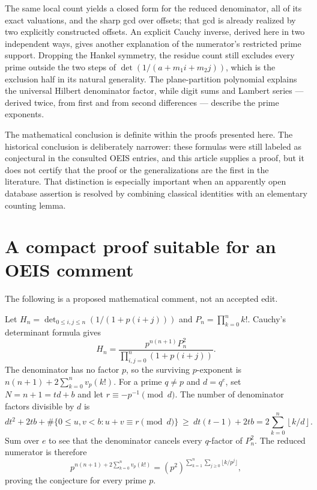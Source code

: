 \documentclass[11pt,a4paper]{article}
\numberwithin{equation}{section}
\theoremstyle{definition}
\theoremstyle{remark}
\newcommand{\floor}[1]{\left\lfloor#1\right\rfloor}
\begin{document}
The same local count yields a closed form for the reduced denominator, all of its exact valuations, and the sharp gcd over offsets; that gcd is already realized by two explicitly constructed offsets. An explicit Cauchy inverse, derived here in two independent ways, gives another explanation of the numerator's restricted prime support. Dropping the Hankel symmetry, the residue count still excludes every prime outside the two steps of $\det(1/(a+m_1i+m_2j))$, which is the exclusion half in its natural generality. The plane-partition polynomial explains the universal Hilbert denominator factor, while digit sums and Lambert series --- derived twice, from first and from second differences --- describe the prime exponents.

The mathematical conclusion is definite within the proofs presented here. The historical conclusion is deliberately narrower: these formulas were still labeled as conjectural in the consulted OEIS entries, and this article supplies a proof, but it does not certify that the proof or the generalizations are the first in the literature. That distinction is especially important when an apparently open database assertion is resolved by combining classical identities with an elementary counting lemma.

\appendix
\section{A compact proof suitable for an OEIS comment}\label{app:comment}
The following is a proposed mathematical comment, not an accepted edit.

Let $H_n=\det_{0\leq i,j\leq n}(1/(1+p(i+j)))$ and $P_n=\prod_{k=0}^n k!$. Cauchy's determinant formula gives
\[
 H_n=\frac{p^{n(n+1)}P_n^2}{\prod_{i,j=0}^n(1+p(i+j))}.
\]
The denominator has no factor $p$, so the surviving $p$-exponent is
$n(n+1)+2\sum_{k=0}^n v_p(k!)$.
For a prime $q\neq p$ and $d=q^e$, set $N=n+1=td+b$ and let $r\equiv-p^{-1}\pmod d$. The number of denominator factors divisible by $d$ is
\[
 dt^2+2tb+\#\{0\leq u,v<b:u+v\equiv r\pmod d\}
 \ \geq\ dt(t-1)+2tb
 =2\sum_{k=0}^n\floor{k/d}.
\]
Sum over $e$ to see that the denominator cancels every $q$-factor of $P_n^2$. The reduced numerator is therefore
\[
 p^{n(n+1)+2\sum_{k=0}^n v_p(k!)}
 =(p^2)^{\sum_{k=1}^n\sum_{j\geq0}\lfloor k/p^j\rfloor},
\]
proving the conjecture for every prime $p$.
\end{document}
